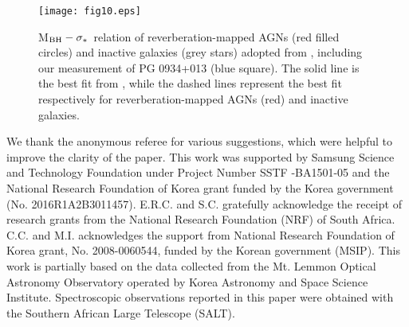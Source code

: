 \documentclass[iop]{emulateapj}
\newcommand{\msigma}{M$_{\rm BH}-\sigma_{*}$}
\begin{document}
\begin{figure}
	\texttt{[image: fig10.eps]}
	\caption{\msigma\ relation of reverberation-mapped AGNs (red filled circles) and inactive galaxies (grey stars)
	adopted from  \citet{Woo2015}, including our measurement of PG 0934+013 (blue square). 
	The solid line is the best fit from \citet{Woo2015}, while the dashed lines represent the best fit respectively for 
	reverberation-mapped AGNs (red) and inactive galaxies. 
		\label{fig8}}
\end{figure} 




\acknowledgments
We thank the anonymous referee for various suggestions, which were helpful to improve the clarity of the paper.
This work was supported by Samsung  Science and Technology Foundation under Project Number SSTF -BA1501-05
and the National Research Foundation of Korea grant funded by the Korea government (No. 2016R1A2B3011457).
E.R.C. and S.C. gratefully acknowledge the receipt of research grants from the National Research Foundation (NRF) of South Africa.
C.C. and M.I. acknowledges the support from National Research Foundation of Korea grant, No. 2008-0060544, funded by the Korean government (MSIP). This work is partially based on the data collected from the Mt. Lemmon Optical Astronomy Observatory operated by Korea Astronomy and Space Science Institute. Spectroscopic observations reported in this paper were obtained with the Southern African Large Telescope (SALT).
\end{document}
